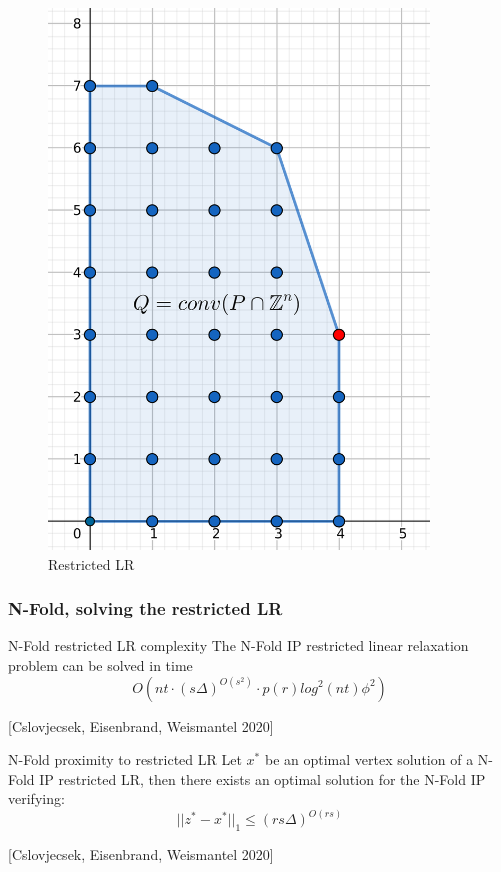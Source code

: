 \documentclass{beamer}
\begin{document}
\begin{frame}
\begin{figure}[!tbp]
\begin{minipage}[b]{0.45\textwidth}
            \includegraphics[width=0.9\textwidth]{images/IP(10).png}
            \caption{Restricted LR}
        \end{minipage}
        \end{figure}
    \end{frame}
    \begin{frame}
        \frametitle{N-Fold, solving the restricted LR}
        \begin{block}{N-Fold restricted LR complexity}
            The N-Fold IP restricted linear relaxation problem can be solved in time
            \begin{equation*}
                O(nt\cdot(s\Delta)^{O(s^2)} \cdot p(r)log^2(nt)\phi^2)
            \end{equation*}
        \end{block}
        [Cslovjecsek, Eisenbrand, Weismantel 2020]
        \vspace{0.5cm}
        \begin{block}{N-Fold proximity to restricted LR}
            Let $x^*$ be an optimal vertex solution of a N-Fold IP restricted LR, then there exists an optimal solution for the N-Fold IP verifying:  
            \begin{equation*}
                ||z^* - x^*||_1 \leq (rs\Delta)^{O(rs)}
            \end{equation*}
        \end{block}
        [Cslovjecsek, Eisenbrand, Weismantel 2020]
    \end{frame}
\end{document}
